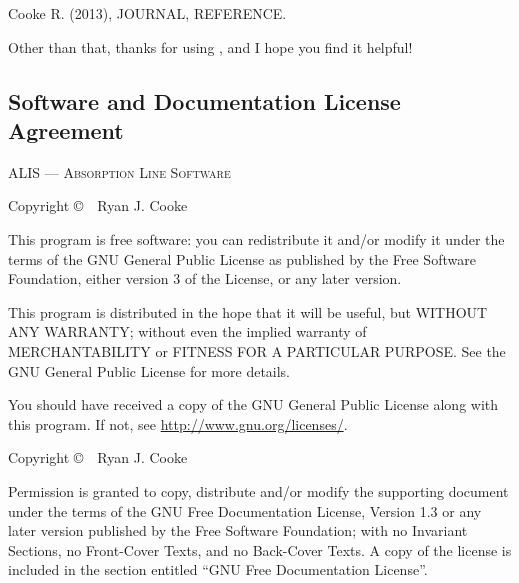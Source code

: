 \vspace{0.2cm}
\noindent
Cooke R. (2013), JOURNAL, REFERENCE.
\vspace{0.2cm}

\noindent
Other than that, thanks for using \alis, and I hope you find it helpful!

\subsection{Software and Documentation License Agreement}

\begin{center}
ALIS --- \textsc{Absorption Line Software}

Copyright \copyright\ \the\year\  Ryan J. Cooke
\end{center}

\noindent
This program is free software: you can redistribute it and/or modify
it under the terms of the GNU General Public License as published by
the Free Software Foundation, either version 3 of the License, or
any later version.

\vspace{0.1cm}

\noindent
This program is distributed in the hope that it will be useful,
but WITHOUT ANY WARRANTY; without even the implied warranty of
MERCHANTABILITY or FITNESS FOR A PARTICULAR PURPOSE.  See the
GNU General Public License for more details.

\vspace{0.2cm}

\noindent
You should have received a copy of the GNU General Public License
along with this program.  If not, see \url{http://www.gnu.org/licenses/}.

\vspace{0.5cm}

\begin{center}
Copyright \copyright\ \the\year\  Ryan J. Cooke
\end{center}

\noindent
Permission is granted to copy, distribute and/or modify the supporting document
under the terms of the GNU Free Documentation License, Version 1.3
or any later version published by the Free Software Foundation;
with no Invariant Sections, no Front-Cover Texts, and no Back-Cover Texts.
A copy of the license is included in the section entitled ``GNU
Free Documentation License''.
